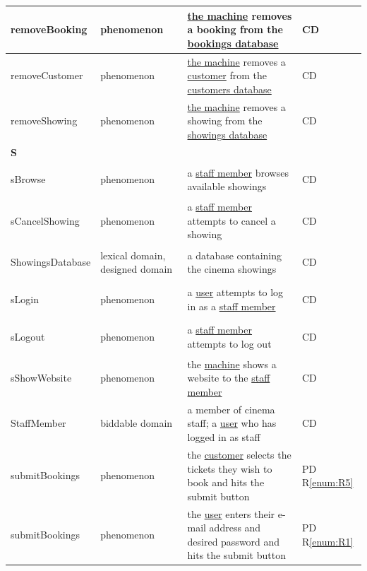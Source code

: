\documentclass[a4paper,10pt,titlepage,bibtotoc,bibtotocnumbered]{scrreprt}
\begin{document}
\begin{longtable}{|l|p{3cm}|p{5cm}|l|}
\hline
\hypertarget{glossary:removeBooking}{removeBooking} & phenomenon &  \hyperlink{glossary:UDEKino}{the machine} removes a booking from the \hyperlink{glossary:BookingsDatabase}{bookings database} & CD\\
\hline
\hypertarget{glossary:removeBooking}{removeCustomer} & phenomenon &  \hyperlink{glossary:UDEKino}{the machine} removes a \hyperlink{glossary:Customer}{customer} from the \hyperlink{glossary:CustomersDatabase}{customers database} & CD\\
\hline
\hypertarget{glossary:Showing}{removeShowing} & phenomenon &  \hyperlink{glossary:UDEKino}{the machine} removes a showing from the \hyperlink{glossary:ShowingsDatabase}{showings database} & CD\\
\hline
\multicolumn{4}{|l|}{\textbf{S}}\\
\hline
\hypertarget{glossary:sBrowse}{sBrowse} & phenomenon & a \hyperlink{glossary:StaffMember}{staff member} browses available showings & CD\\
\hline
\hypertarget{glossary:sCancelShowing}{sCancelShowing} & phenomenon & a \hyperlink{glossary:StaffMember}{staff member} attempts to cancel a showing & CD\\
\hline
\hypertarget{glossary:ShowingsDatabase}{ShowingsDatabase} & lexical domain, designed domain & a database containing the cinema showings & CD\\
\hline
\hypertarget{glossary:sLogin}{sLogin} & phenomenon & a \hyperlink{glossary:User}{user} attempts to log in as a \hyperlink{glossary:StaffMember}{staff member} & CD\\
\hline
\hypertarget{glossary:sLogout}{sLogout} & phenomenon & a \hyperlink{glossary:StaffMember}{staff member} attempts to log out & CD\\
\hline
\hypertarget{glossary:sShowWebsite}{sShowWebsite} & phenomenon & the \hyperlink{glossary:UDEKino}{machine} shows a website to the \hyperlink{glossary:StaffMember}{staff member} & CD\\
\hline
\hypertarget{glossary:StaffMember}{StaffMember} & biddable domain & a member of cinema staff; a \hyperlink{glossary:User}{user} who has logged in as staff & CD\\
\hline
\hypertarget{glossary:submitBookings}{submitBookings} & phenomenon & the \hyperlink{glossary:Customer}{customer} selects the tickets they wish to book and hits the submit button &  PD R\ref{enum:R5}\\
\hline
\hypertarget{glossary:submitRegistration}{submitBookings} & phenomenon & the \hyperlink{glossary:User}{user} enters their e-mail address and desired password and hits the submit button & PD R\ref{enum:R1}\\

\end{longtable}
\end{document}
